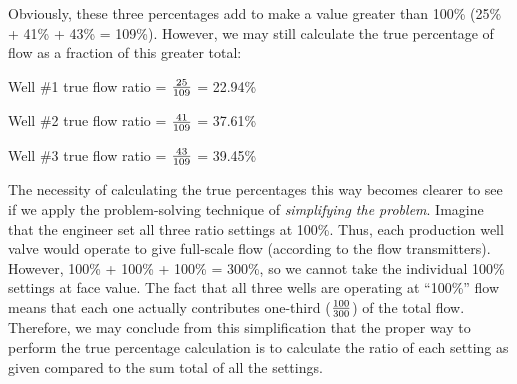 
Obviously, these three percentages add to make a value greater than 100\% (25\% + 41\% + 43\% = 109\%).  However, we may still calculate the true percentage of flow as a fraction of this greater total:

\vskip 10pt

Well \#1 true flow ratio = $25 \over 109$ = 22.94\%

\vskip 10pt

Well \#2 true flow ratio = $41 \over 109$ = 37.61\%

\vskip 10pt

Well \#3 true flow ratio = $43 \over 109$ = 39.45\%

\vskip 10pt

The necessity of calculating the true percentages this way becomes clearer to see if we apply the problem-solving technique of {\it simplifying the problem}.  Imagine that the engineer set all three ratio settings at 100\%.  Thus, each production well valve would operate to give full-scale flow (according to the flow transmitters).  However, 100\% + 100\% + 100\% = 300\%, so we cannot take the individual 100\% settings at face value.  The fact that all three wells are operating at ``100\%'' flow means that each one actually contributes one-third ($100 \over 300$) of the total flow.  Therefore, we may conclude from this simplification that the proper way to perform the true percentage calculation is to calculate the ratio of each setting as given compared to the sum total of all the settings.




